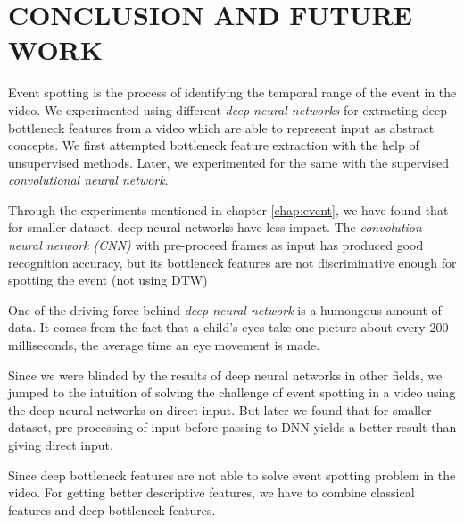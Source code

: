\chapter{CONCLUSION AND FUTURE WORK} 
\label{chap:concl}
Event spotting is the process of identifying the temporal range of the event in the video. We experimented using  different \textit{deep neural networks} for extracting deep bottleneck features from a video which are able to represent input as abstract concepts. We first attempted bottleneck feature extraction with the help of unsupervised methods. Later, we experimented for the same with the supervised \textit{convolutional neural network}.

Through the experiments mentioned in chapter \ref{chap:event}, we have found that for smaller dataset, deep neural networks have less impact.  The \textit{convolution neural network (CNN)} with pre-proceed frames as input has produced good recognition accuracy, but its bottleneck features are not discriminative enough for spotting the event (not using DTW)

One of the driving force behind \textit{deep neural network} is a humongous amount of data. It comes from the fact that a child's eyes take one picture about every 200 milliseconds, the average time an eye movement is made. 

Since we were blinded by the results of deep neural networks in other fields, we jumped to the intuition of solving the challenge of event spotting in a video using the deep neural networks on direct input. But later we found that for smaller dataset, pre-processing of input before passing to DNN yields a better result than giving direct input.

Since deep bottleneck features are not able to solve event spotting problem in the video. For getting better descriptive features, we have to combine classical features and deep bottleneck features.  

